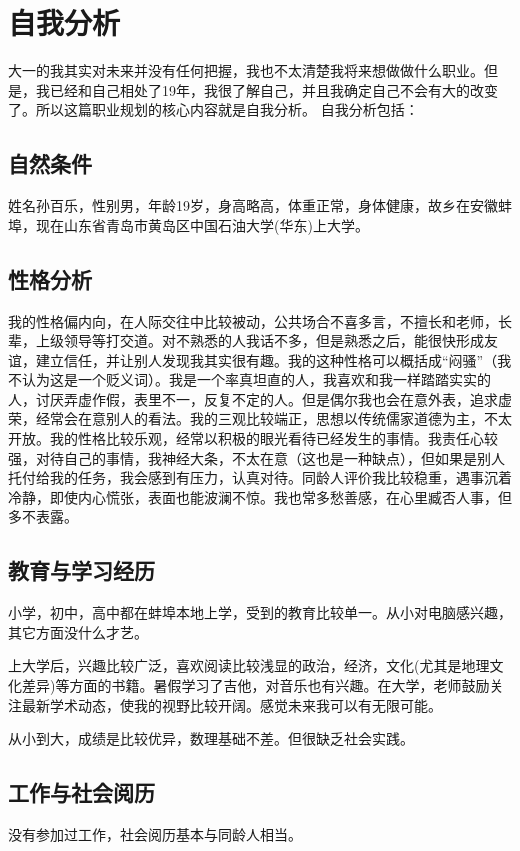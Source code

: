\documentclass{article}
\begin{document}
\thispagestyle{empty}
\newpage
\setcounter{page}{1}
\section{自我分析}
	大一的我其实对未来并没有任何把握，我也不太清楚我将来想做做什么职业。但是，我已经和自己相处了19年，我很了解自己，并且我确定自己不会有大的改变了。所以这篇职业规划的核心内容就是自我分析。
	自我分析包括：
\subsection{自然条件}
姓名孙百乐，性别男，年龄19岁，身高略高，体重正常，身体健康，故乡在安徽蚌埠，现在山东省青岛市黄岛区中国石油大学(华东)上大学。\par
\subsection{性格分析}
我的性格偏内向，在人际交往中比较被动，公共场合不喜多言，不擅长和老师，长辈，上级领导等打交道。对不熟悉的人我话不多，但是熟悉之后，能很快形成友谊，建立信任，并让别人发现我其实很有趣。我的这种性格可以概括成“闷骚”（我不认为这是一个贬义词）。我是一个率真坦直的人，我喜欢和我一样踏踏实实的人，讨厌弄虚作假，表里不一，反复不定的人。但是偶尔我也会在意外表，追求虚荣，经常会在意别人的看法。我的三观比较端正，思想以传统儒家道德为主，不太开放。我的性格比较乐观，经常以积极的眼光看待已经发生的事情。我责任心较强，对待自己的事情，我神经大条，不太在意（这也是一种缺点），但如果是别人托付给我的任务，我会感到有压力，认真对待。同龄人评价我比较稳重，遇事沉着冷静，即使内心慌张，表面也能波澜不惊。我也常多愁善感，在心里臧否人事，但多不表露。\par
\subsection{教育与学习经历}
小学，初中，高中都在蚌埠本地上学，受到的教育比较单一。从小对电脑感兴趣，其它方面没什么才艺。\par
上大学后，兴趣比较广泛，喜欢阅读比较浅显的政治，经济，文化(尤其是地理文化差异)等方面的书籍。暑假学习了吉他，对音乐也有兴趣。在大学，老师鼓励关注最新学术动态，使我的视野比较开阔。感觉未来我可以有无限可能。\par
从小到大，成绩是比较优异，数理基础不差。但很缺乏社会实践。
\subsection{工作与社会阅历}
没有参加过工作，社会阅历基本与同龄人相当。\par
\end{document}
